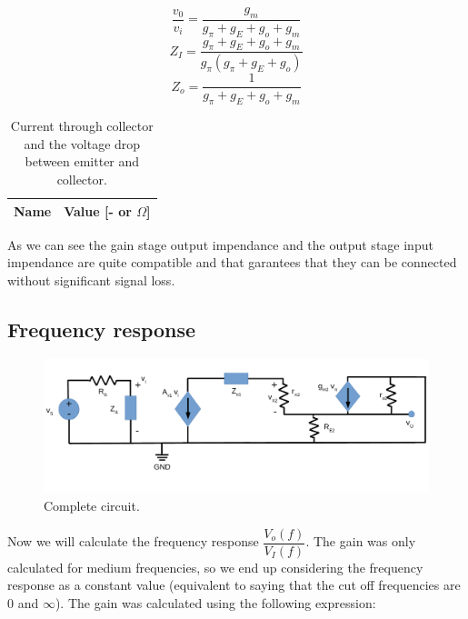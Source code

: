 \begin{equation}
    \dfrac{v_{0}}{v_{i}}=\dfrac{g_{m}}{g_{\pi }+g_{E}+g_{o}+g_{m}}
\end{equation}
\begin{equation}
    Z_{I}=\dfrac{g_{\pi }+g_{E}+g_{o}+g_{m}}{g_{\pi} \left( g_{\pi} +g_{E}+g_{o}\right) }
\end{equation}
\begin{equation}
    Z_{o}=\dfrac{1}{g_{\pi }+g_{E}+g_{o}+g_{m}}
\end{equation}

\begin{table}[h]
    \centering
    \begin{tabular}{|l|r|}
      \hline
      {\bf Name} & {\bf Value [- or $\Omega$]} \\ \hline
      
    \end{tabular}
    \caption{Current through collector and the voltage drop between emitter and collector.}
    \label{tab:stage2_tab}
\end{table}

As we can see the gain stage output impendance and the output stage input impendance are quite compatible
and that garantees that they can be connected without significant signal loss.

\subsection{Frequency response}

\begin{figure}[H] \centering
    \includegraphics[scale=0.55]{lab4_AC_Total.pdf}
    \caption{Complete circuit.}
    \label{fig:CompleteCircuit}
\end{figure}

Now we will calculate the frequency response $\dfrac{V_{o}(f)}{V_{I}(f)}$. 
The gain was only calculated for medium frequencies, so we end up considering the frequency response as a 
constant value (equivalent to saying that the cut off frequencies are 0 and $\infty$). The gain was calculated using the following expression:

